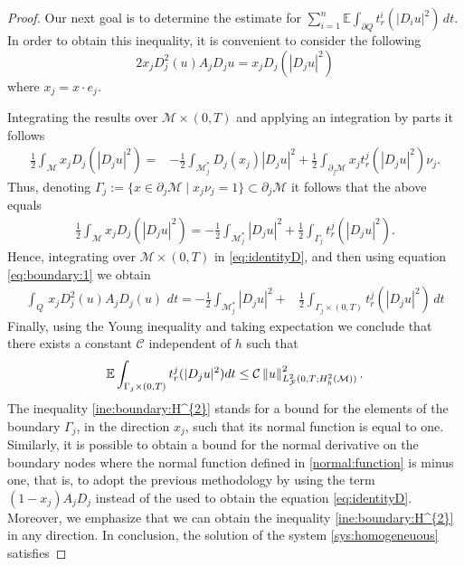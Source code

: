 \documentclass[10pt,a4paper]{amsart}
\newcommand{\E}{\mathbb{E}}
\begin{document}
\begin{proof}
Our next goal is to determine the estimate for $\displaystyle \sum_{i=1}^{n}\E\int_{\partial Q}t_{r}^{i}(|D_iu|^2)\,dt$. In order to obtain this inequality, it is convenient to consider the following 
\begin{equation}\label{eq:identityD}
2x_{j}D_{j}^2(u)A_{j}D_ju=x_{j}D_{j}(|D_ju|^2)
\end{equation}
where $x_{j}=x\cdot e_{j}$.

Integrating the results over $\mathcal{M}\times(0,T)$ and applying an integration by parts it follows
\begin{align*}
    \frac{1}{2}\int_{\mathcal{M}}x_{j}D_{j}(|D_{j}u|^{2})=&-\frac{1}{2}\int_{\mathcal{M}^{\ast}_{j}}D_{j}(x_{j})|D_{j}u|^{2}+\frac{1}{2}\int_{\partial_{j}\mathcal{M}}x_{j}t_{r}^{j}(|D_{j}u|^{2})\nu_{j}.
\end{align*}
Thus, denoting $\Gamma_{j}:=\{ x\in\partial_{j}\mathcal{M}\mid x_{j}\nu_{j}= 1\}\subset\partial_j\mathcal{M}$ it follows that the above equals
\begin{align}\label{eq:boundary:1}
    \frac{1}{2}\int_{\mathcal{M}}x_{j}D_{j}(|D_{j}u|^{2})=-\frac{1}{2}\int_{\mathcal{M}_{j}^{\ast}}|D_{j}u|^2+\frac{1}{2}\int_{\Gamma_{j}}t_{r}^{j}(|D_{j}u|^{2}).
\end{align}
Hence, integrating over $\mathcal{M}\times (0,T)$ in \eqref{eq:identityD}, and then  using equation \eqref{eq:boundary:1} we obtain
\begin{equation}
\begin{aligned}
\int_{Q}\,x_{j}D_j^2(u)A_{j}D_{j}(u)\,\,dt=-\frac{1}{2}\int_{\mathcal{M}_{j}^{\ast}}|D_{j}u|^2+&\frac{1}{2}\int_{\Gamma_{j}\times(0,T)}t_{r}^{j}(|D_{j}u|^{2})\,dt
\end{aligned}
\end{equation}
Finally, using the Young inequality and taking expectation we conclude that there exists a constant $\mathcal{C}$ independent of $h$ such that
\begin{equation}\label{ine:boundary:H^{2}}
    \E\int_{\Gamma_{j}\times(0,T)}t_{r}^{j}(|D_{j}u|^{2})dt\leq \mathcal{C}\left\| u\right\|^{2}_{L^{2}_{\mathcal{F}}(0,T;H_h^{2}(\mathcal{M}))}.
\end{equation}
The inequality \eqref{ine:boundary:H^{2}} stands for a bound for the elements of the boundary $\Gamma_{j}$, in the direction $x_{j}$, such that its normal function is equal to one. Similarly, it is possible to obtain a bound for the normal derivative on the boundary nodes where the normal function defined in \eqref{normal:function} is minus one, that is, to adopt the previous methodology by using the term $(1-x_{j})A_{j}D_{j}$ instead of the used to obtain the equation \eqref{eq:identityD}. Moreover, we emphasize that we can obtain the inequality \eqref{ine:boundary:H^{2}} in any direction. In conclusion, the solution of the system \eqref{sys:homogeneuous} satisfies

\end{proof}
\end{document}
